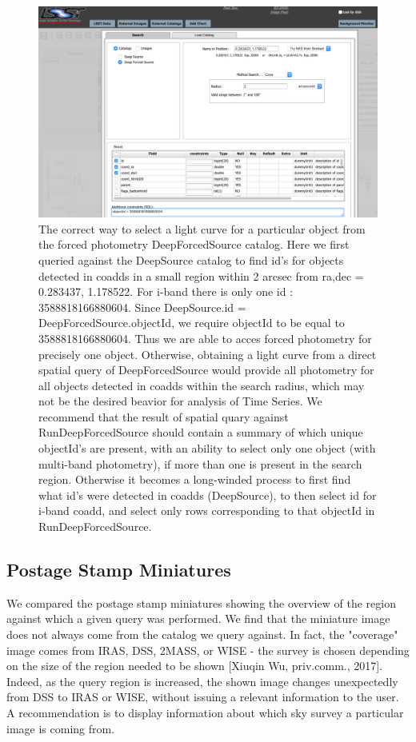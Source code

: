 \documentclass[DM,lsstdraft,toc,usenatbib]{lsstdoc}
\begin{document}
\begin{figure}
\includegraphics[width=\textwidth]{figs/4_PDAC_cone_DeepForcedSource}
\caption{The correct way to select a light curve for a  particular object from the forced photometry DeepForcedSource catalog.  Here we first queried against the DeepSource catalog to find  id's for objects detected in coadds in a small region within 2 arcsec from ra,dec =  0.283437, 1.178522. For i-band there is only one id :  3588818166880604. Since DeepSource.id =  DeepForcedSource.objectId,  we require objectId to be equal to  3588818166880604. Thus we are able to acces forced photometry for precisely one object.  Otherwise, obtaining a light curve from a direct spatial  query of DeepForcedSource would provide all photometry for all objects detected in coadds within the search radius, which may not be the desired beavior for analysis of Time Series. We recommend that the result of spatial quary against RunDeepForcedSource should contain a summary of which unique objectId's are present,  with an ability to select only one object (with multi-band photometry), if more than one is present in the search region. Otherwise it becomes a long-winded process to first find what id's were detected in coadds (DeepSource), to then select id for i-band coadd, and select only rows corresponding to that objectId in RunDeepForcedSource.}
\label{fig:PDAC_cone_DFS}
\end{figure}




\subsection{Postage Stamp Miniatures }
\label{sec:miniatures}
We compared the postage stamp miniatures showing the overview of the region against which a given query was performed. We find that the miniature image does not always come from the catalog we query against.  In fact, the "coverage" image comes from IRAS, DSS, 2MASS, or WISE -  the survey is chosen depending on the size of the region needed to be shown [Xiuqin Wu, priv.comm., 2017].  Indeed, as the query region is increased,  the shown image changes unexpectedly from DSS to IRAS or WISE, without issuing a relevant information to the user.  A recommendation is to display information about which sky survey a particular image is coming from.  
\end{document}
